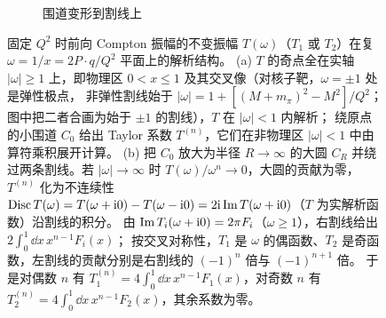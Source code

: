 \begin{figure}[htbp]
\begin{subfigure}[b]{0.48\textwidth}
\caption{围道变形到割线上}
\end{subfigure}
\caption{固定 $Q^2$ 时前向 Compton 振幅的不变振幅 $T(\omega)$（$T_1$ 或 $T_2$）在复 $\omega=1/x=2P\cdot q/Q^2$ 平面上的解析结构。
(a) $T$ 的奇点全在实轴 $|\omega|\ge1$ 上，即物理区 $0<x\le1$ 及其交叉像（对核子靶，$\omega=\pm1$ 处是弹性极点，
非弹性割线始于 $|\omega|=1+[(M+m_\pi)^2-M^2]/Q^2$；图中把二者合画为始于 $\pm1$ 的割线），$T$ 在 $|\omega|<1$ 内解析；
绕原点的小围道 $C_0$ 给出 Taylor 系数 $T^{(n)}$，它们在非物理区 $|\omega|<1$ 中由算符乘积展开计算。
(b) 把 $C_0$ 放大为半径 $R\to\infty$ 的大圆 $C_R$ 并绕过两条割线。若 $|\omega|\to\infty$ 时 $T(\omega)/\omega^{n}\to0$，大圆的贡献为零，
$T^{(n)}$ 化为不连续性 $\operatorname{Disc} T(\omega)=T(\omega+\mathrm{i}0)-T(\omega-\mathrm{i}0)=2\mathrm{i}\operatorname{Im} T(\omega+\mathrm{i}0)$（$T$ 为实解析函数）沿割线的积分。
由 $\operatorname{Im} T_i(\omega+\mathrm{i}0)=2\pi F_i$（$\omega\ge1$），右割线给出 $2\int_0^1\dd x\,x^{n-1}F_i(x)$；
按交叉对称性，$T_1$ 是 $\omega$ 的偶函数、$T_2$ 是奇函数，左割线的贡献分别是右割线的 $(-1)^n$ 倍与 $(-1)^{n+1}$ 倍。
于是对偶数 $n$ 有 $T_1^{(n)}=4\int_0^1\dd x\,x^{n-1}F_1(x)$，对奇数 $n$ 有 $T_2^{(n)}=4\int_0^1\dd x\,x^{n-1}F_2(x)$，其余系数为零。}
\label{fig:omega-plane}
\end{figure}

